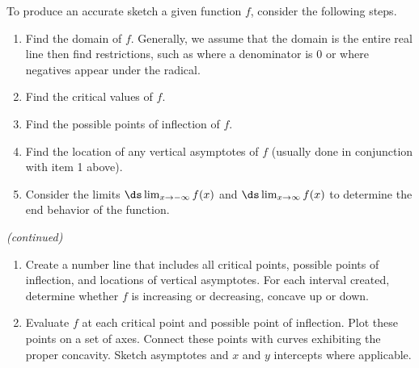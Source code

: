 \enlargethispage{2\baselineskip}
{}
{To produce an accurate sketch a given function $f$, consider the following steps.
\begin{enumerate}
\item		Find the domain of $f$. Generally, we assume that the domain is the entire real line then find restrictions, such as where a denominator is 0 or where negatives appear under the radical.
\item		Find the critical values of $f$.
\item		Find the possible points of inflection of $f$.
\item		Find the location of any vertical asymptotes of $f$ (usually done in conjunction with item 1 above).
\item		Consider the limits $\ds\lim_{x\to-\infty}f(x)$ and $\ds\lim_{x\to\infty}f(x)$ to determine the end behavior of the function.
\end{enumerate}
\small\textit{(continued)}\normalsize
}
\addtocounter{keyideacounter}{-1}
{%
\begin{enumerate}\addtocounter{enumi}{5}
\item		Create a number line that includes all critical points, possible points of inflection, and locations of vertical asymptotes. For each interval created, determine whether $f$ is increasing or decreasing, concave up or down.
\item		Evaluate $f$ at each critical point and possible point of inflection. Plot these points on a set of axes. Connect these points with curves exhibiting the proper concavity. Sketch asymptotes and $x$ and $y$ intercepts where applicable.
\end{enumerate}
}
